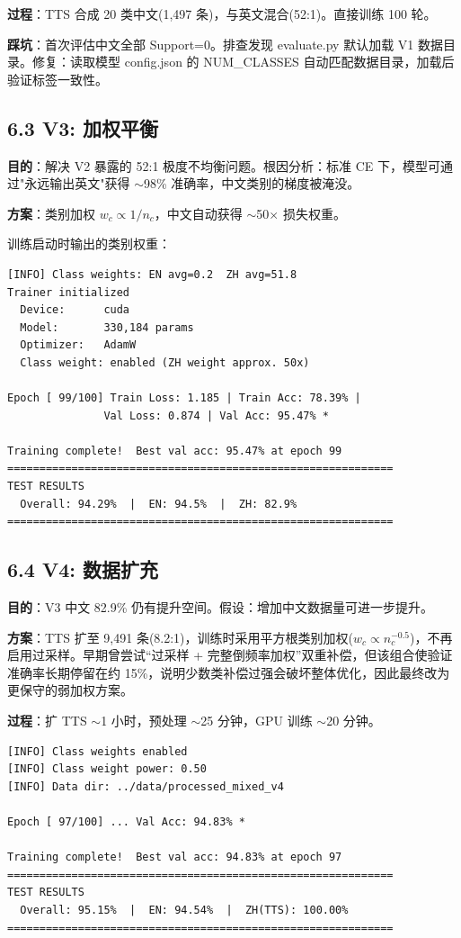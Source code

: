 ﻿\documentclass[12pt,a4paper]{article}
\begin{document}
\textbf{过程}：TTS 合成 20 类中文(1,497 条)，与英文混合(52:1)。直接训练 100 轮。

\textbf{踩坑}：首次评估中文全部 Support=0。排查发现 evaluate.py 默认加载 V1 数据目录。修复：读取模型 config.json 的 NUM\_CLASSES 自动匹配数据目录，加载后验证标签一致性。

\subsection*{6.3 V3: 加权平衡}

\textbf{目的}：解决 V2 暴露的 52:1 极度不均衡问题。根因分析：标准 CE 下，模型可通过"永远输出英文"获得 $\sim$98\% 准确率，中文类别的梯度被淹没。

\textbf{方案}：类别加权 $w_c\propto 1/n_c$，中文自动获得 $\sim$50$\times$ 损失权重。

训练启动时输出的类别权重：

\begin{verbatim}
[INFO] Class weights: EN avg=0.2  ZH avg=51.8
Trainer initialized
  Device:      cuda
  Model:       330,184 params
  Optimizer:   AdamW
  Class weight: enabled (ZH weight approx. 50x)

Epoch [ 99/100] Train Loss: 1.185 | Train Acc: 78.39% |
               Val Loss: 0.874 | Val Acc: 95.47% *

Training complete!  Best val acc: 95.47% at epoch 99
============================================================
TEST RESULTS
  Overall: 94.29%  |  EN: 94.5%  |  ZH: 82.9%
============================================================
\end{verbatim}

\subsection*{6.4 V4: 数据扩充}

\textbf{目的}：V3 中文 82.9\% 仍有提升空间。假设：增加中文数据量可进一步提升。

\textbf{方案}：TTS 扩至 9,491 条(8.2:1)，训练时采用平方根类别加权($w_c\propto n_c^{-0.5}$)，不再启用过采样。早期曾尝试“过采样 + 完整倒频率加权”双重补偿，但该组合使验证准确率长期停留在约 15\%，说明少数类补偿过强会破坏整体优化，因此最终改为更保守的弱加权方案。

\textbf{过程}：扩 TTS $\sim$1 小时，预处理 $\sim$25 分钟，GPU 训练 $\sim$20 分钟。

\begin{verbatim}
[INFO] Class weights enabled
[INFO] Class weight power: 0.50
[INFO] Data dir: ../data/processed_mixed_v4

Epoch [ 97/100] ... Val Acc: 94.83% *

Training complete!  Best val acc: 94.83% at epoch 97
============================================================
TEST RESULTS
  Overall: 95.15%  |  EN: 94.54%  |  ZH(TTS): 100.00%
============================================================
\end{verbatim}
\end{document}
